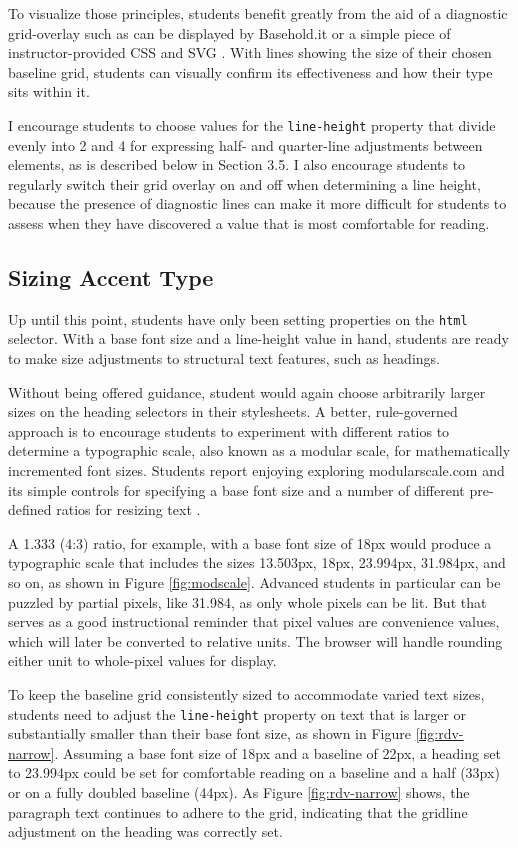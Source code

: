\documentclass[sigplan,screen]{acmart}
\begin{document}
To visualize those principles, students benefit greatly from the aid of a diagnostic grid-overlay such as can be displayed by Basehold.it or a simple piece of instructor-provided CSS and SVG \cite{basehold}. With lines showing the size of their chosen baseline grid, students can visually confirm its effectiveness and how their type sits within it.

I encourage students to choose values for the \verb|line-height| property that divide evenly into 2 and 4 for expressing half- and quarter-line adjustments between elements, as is described below in Section 3.5. I also encourage students to regularly switch their grid overlay on and off when determining a line height, because the presence of diagnostic lines can make it more difficult for students to assess when they have discovered a value that is most comfortable for reading.

\subsection{Sizing Accent Type}

Up until this point, students have only been setting properties on the \verb|html| selector. With a base font size and a line-height value in hand, students are ready to make size adjustments to structural text features, such as headings.

Without being offered guidance, student would again choose arbitrarily larger sizes on the heading selectors in their stylesheets. A better, rule-governed approach is to encourage students to experiment with different ratios to determine a typographic scale, also known as a modular scale, for mathematically incremented font sizes. Students report enjoying exploring modularscale.com and its simple controls for specifying a base font size and a number of different pre-defined ratios for resizing text \cite{modscale}.

A 1.333 (4:3) ratio, for example, with a base font size of 18px would produce a typographic scale that includes the sizes 13.503px, 18px, 23.994px, 31.984px, and so on, as shown in Figure \ref{fig:modscale}. Advanced students in particular can be puzzled by partial pixels, like 31.984, as only whole pixels can be lit. But that serves as a good instructional reminder that pixel values are convenience values, which will later be converted to relative units. The browser will handle rounding  either unit to whole-pixel values for display.

To keep the baseline grid consistently sized to accommodate varied text sizes, students need to adjust the \verb|line-height| property on text that is larger or substantially smaller than their base font size, as shown in Figure \ref{fig:rdv-narrow}. Assuming a base font size of 18px and a baseline of 22px, a heading set to 23.994px could be set for comfortable reading on a baseline and a half (33px) or on a fully doubled baseline (44px). As Figure \ref{fig:rdv-narrow} shows, the paragraph text continues to adhere to the grid, indicating that the gridline adjustment on the heading was correctly set.
\end{document}
